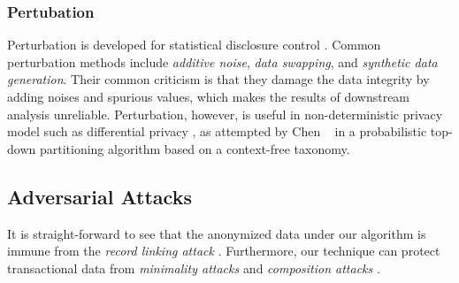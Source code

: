 \subsubsection{Pertubation}

Perturbation is developed for statistical disclosure control
\cite{FungWCY10:Survey}. Common perturbation methods include {\em additive
noise}, {\em data swapping}, and {\em synthetic data generation}. Their
common criticism is that they damage the data integrity by adding noises and
spurious values, which makes the results of downstream analysis unreliable.
Perturbation, however, is useful in non-deterministic privacy model such as
differential privacy \cite{Dwork08:diff:survey}, as
attempted by Chen \etal~ \cite{ChenMFDX11:Diff} in a probabilistic top-down
partitioning algorithm based on a context-free taxonomy.
%

\subsection{Adversarial Attacks}
It is straight-forward to see that the anonymized data under our algorithm
is immune from the {\em record linking attack} \cite{FungWCY10:Survey}.
Furthermore, our technique can protect transactional data from {\em minimality
attacks} \cite{Wong:2007:Minimality} and {\em composition attacks} \cite{Ganta:2008:Composition}.

